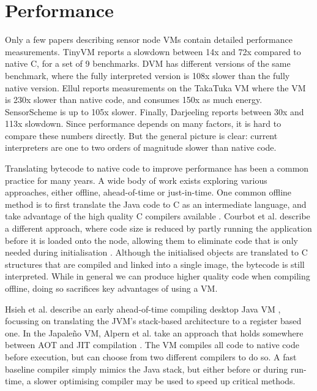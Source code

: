\section{Performance}
Only a few papers describing sensor node VMs contain detailed performance measurements. TinyVM \cite{Hong:2009gc} reports a slowdown between 14x and 72x compared to native C, for a set of 9 benchmarks. DVM \cite{Balani:2006} has different versions of the same benchmark, where the fully interpreted version is 108x slower than the fully native version. Ellul reports measurements on the TakaTuka VM \cite{Aslam:2008, Ellul:2012thesis} where the VM is 230x slower than native code, and consumes 150x as much energy. SensorScheme \cite{Evers:2010ur} is up to 105x slower. Finally, Darjeeling \cite{Brouwers:2009cj} reports between 30x and 113x slowdown. Since performance depends on many factors, it is hard to compare these numbers directly. But the general picture is clear: current interpreters are one to two orders of magnitude slower than native code.

Translating bytecode to native code to improve performance has been a common practice for many years. A wide body of work exists exploring various approaches, either offline, ahead-of-time  or just-in-time. One common offline method is to first translate the Java code to C as an intermediate language, and take advantage of the high quality C compilers available \cite{Muller:1997}. Courbot et al. describe a different approach, where code size is reduced by partly running the application before it is loaded onto the node, allowing them to eliminate code that is only needed during initialisation \cite{Courbot:2010}. Although the initialised objects are translated to C structures that are compiled and linked into a single image, the bytecode is still interpreted. While in general we can produce higher quality code when compiling offline, doing so sacrifices key advantages of using a VM.

Hsieh et al. describe an early ahead-of-time compiling desktop Java VM \cite{Hsieh:1996cy}, focussing on translating the JVM's stack-based architecture to a register based one. In the Japale\~no VM, Alpern et al. take an approach that holds somewhere between AOT and JIT compilation \cite{Alpern:1999}. The VM compiles all code to native code before execution, but can choose from two different compilers to do so. A fast baseline compiler simply mimics the Java stack, but either before or during run-time, a slower optimising compiler may be used to speed up critical methods.

